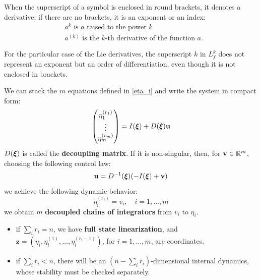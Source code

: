 \documentclass[10pt, a4paper]{report}
\begin{document}
\begin{boxnotation}{}{}
When the superscript of a symbol is enclosed in round brackets, it denotes a derivative; if there are no brackets, it is an exponent or an index:\begin{align}
    &a^k \text{ is $a$ raised to the power $k$}\\
    &a^{(k)} \text{ is the $k$-th derivative of the function $a$.}
\end{align}
\end{boxnotation}
For the particular case of the Lie derivatives, the superscript $k$ in $L_f^k$ does not represent an exponent but an order of differentiation, even though it is not enclosed in brackets.\bigskip

\noindent We can stack the $m$ equations defined in \eqref{eta_i} and write the system in compact form:\begin{equation}\label{i_o_linearized_model}
    \begin{pmatrix}
        \eta_1^{(r_1)}\\\vdots\\
        \eta_m^{(r_m)}
    \end{pmatrix}=I({\boldsymbol{\xi}})+D({\boldsymbol{\xi}})\mathbf u
\end{equation}
$D({\boldsymbol{\xi}})$ is called the \textbf{decoupling matrix}. If it is non-singular, then, for $\mathbf v\in{\mathbb R}^m$, choosing the following control law:\begin{equation}
    \mathbf u=D^{-1}({\boldsymbol{\xi}})(-I({\boldsymbol{\xi}})+{\mathbf v})
\end{equation}
we achieve the following dynamic behavior:\begin{equation}
    \eta_i^{(r_i)}=v_i,\quad i=1,\dots,m 
\end{equation}
we obtain $m$ \textbf{decoupled chains of integrators} from $v_i$ to $\eta_i$.
\begin{itemize}
    \item if $\sum_ir_i=n$, we have \textbf{full state linearization}, and $\mathbf z=(\eta_i,\eta_i^{(1)},\dots,\eta_i^{(r_i-1)})$, for $i=1,\dots,m$, are coordinates.
    \item if $\sum_ir_i<n$, there will be an $(n-\sum_ir_i)$-dimensional internal dynamics, whose stability must be checked separately.
\end{itemize}
\end{document}
